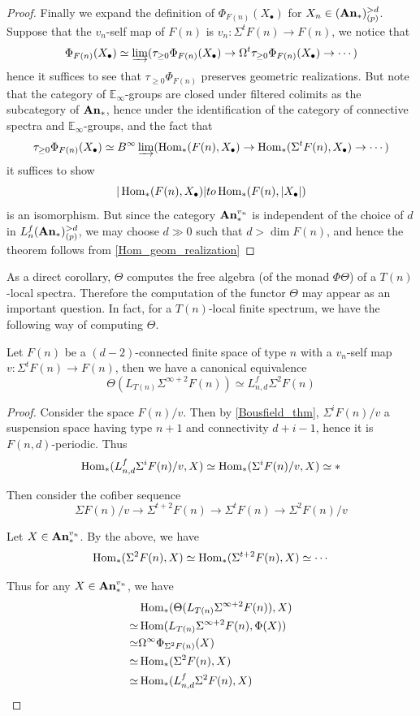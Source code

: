 \begin{proof}
		Finally we expand the definition of $\Phi_{F(n)}(X_\bullet)$ for $X_n\in(\mathbf{An}_*)_{(p)}^{>d}$. Suppose that the $v_n$-self map of $F(n)$ is $v_n:\Sigma^tF(n)\to F(n)$, we notice that 
		\[ \Phi_{F(n)}(X_\bullet)\simeq\varinjlim(\tau_{\geq0}\Phi_{F(n)}(X_\bullet)\to\Omega^t\tau_{\geq0}\Phi_{F(n)}(X_\bullet)\to\cdots) \]
		hence it suffices to see that $\tau_{\geq0}\Phi_{F(n)}$ preserves geometric realizations. But note that the category of $\mathbb{E}_\infty$-groups are closed under filtered colimits as the subcategory of $\mathbf{An}_*$, hence under the identification of the category of connective spectra and $\mathbb{E}_\infty$-groups, and the fact that 
		\[ \tau_{\geq0}\Phi_{F(n)}(X_\bullet)\simeq B^\infty\varinjlim(\operatorname{\mathrm{Hom}}_*(F(n),X_\bullet)\to\operatorname{\mathrm{Hom}}_*(\Sigma^tF(n),X_\bullet)\to\cdots) \]
		it suffices to show 
		\[ |\operatorname{\mathrm{Hom}}_*(F(n),X_\bullet)|to\operatorname{\mathrm{Hom}}_*(F(n),|X_\bullet|) \]
		is an isomorphism. But since the category $\mathbf{An}_*^{v_n}$ is independent of the choice of $d$ in $L_n^f(\mathbf{An}_*)_{(p)}^{>d}$, we may choose $d\gg0$ such that $d>\dim F(n)$, and hence the theorem follows from \cref{Hom_geom_realization}
	\end{proof}

	As a direct corollary, $\Theta$ computes the free algebra (of the monad $\Phi\Theta$) of a $T(n)$-local spectra. Therefore the computation of the functor $\Theta$ may appear as an important question. In fact, for a $T(n)$-local finite spectrum, we have the following way of computing $\Theta$. 

	\begin{prop}\label{Val_theta_fin_sp}
		Let $F(n)$ be a $(d-2)$-connected finite space of type $n$ with a $v_n$-self map $v:\Sigma^tF(n)\to F(n)$, then we have a canonical equivalence 
		\[ \Theta(L_{T(n)}\Sigma^{\infty+2}F(n))\simeq L_{n,d}^f\Sigma^2F(n) \]
	\end{prop}
	\begin{proof}
		Consider the space $F(n)/v$. Then by \cref{Bousfield_thm}, $\Sigma^iF(n)/v$ a suspension space having type $n+1$ and connectivity $d+i-1$, hence it is $F(n,d)$-periodic. Thus
		\[ \operatorname{\mathrm{Hom}}_*(L_{n,d}^f\Sigma^iF(n)/v,X)\simeq\operatorname{\mathrm{Hom}}_*(\Sigma^iF(n)/v,X)\simeq* \]

		Then consider the cofiber sequence 
		\[ \Sigma F(n)/v\to\Sigma^{t+2}F(n)\to\Sigma^tF(n)\to\Sigma^2F(n)/v \]

		Let $X\in\mathbf{An}_*^{v_n}$. By the above, we have 
		\[ \operatorname{\mathrm{Hom}}_*(\Sigma^2F(n),X)\simeq\operatorname{\mathrm{Hom}}_*(\Sigma^{t+2}F(n),X)\simeq\cdots \]

		Thus for any $X\in\mathbf{An}_*^{v_n}$, we have 
		\begin{align*}
			&\operatorname{\mathrm{Hom}}_*(\Theta(L_{T(n)}\Sigma^{\infty+2}F(n)),X) \\
			\simeq&\operatorname{\mathrm{Hom}}(L_{T(n)}\Sigma^{\infty+2}F(n),\Phi(X)) \\
			\simeq&\Omega^\infty\Phi_{\Sigma^2F(n)}(X) \\
			\simeq&\operatorname{\mathrm{Hom}}_*(\Sigma^2F(n),X) \\
			\simeq&\operatorname{\mathrm{Hom}}_*(L_{n,d}^f\Sigma^2F(n),X)
		\end{align*}
	\end{proof}

